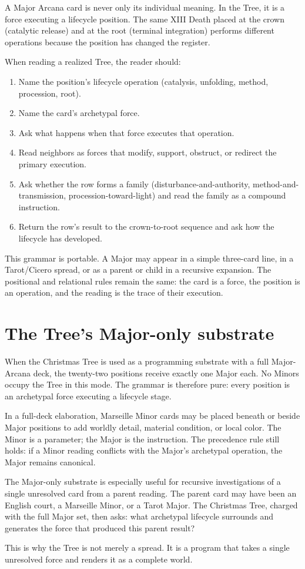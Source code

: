 A Major Arcana card is never only its individual meaning. In the Tree, it is a
force executing a lifecycle position. The same XIII Death placed at the crown
(catalytic release) and at the root (terminal integration) performs different
operations because the position has changed the register.

When reading a realized Tree, the reader should:

\begin{enumerate}
\item Name the position's lifecycle operation (catalysis, unfolding, method,
      procession, root).
\item Name the card's archetypal force.
\item Ask what happens when that force executes that operation.
\item Read neighbors as forces that modify, support, obstruct, or redirect the
      primary execution.
\item Ask whether the row forms a family (disturbance-and-authority,
      method-and-transmission, procession-toward-light) and read the family as a
      compound instruction.
\item Return the row's result to the crown-to-root sequence and ask how the
      lifecycle has developed.
\end{enumerate}

This grammar is portable. A Major may appear in a simple three-card line, in a
Tarot/Cicero spread, or as a parent or child in a recursive expansion. The
positional and relational rules remain the same: the card is a force, the
position is an operation, and the reading is the trace of their execution.

\section{The Tree's Major-only substrate}

When the Christmas Tree is used as a programming substrate with a full
Major-Arcana deck, the twenty-two positions receive exactly one Major each. No
Minors occupy the Tree in this mode. The grammar is therefore pure: every
position is an archetypal force executing a lifecycle stage.

In a full-deck elaboration, Marseille Minor cards may be placed beneath or
beside Major positions to add worldly detail, material condition, or local
color. The Minor is a parameter; the Major is the instruction. The precedence
rule still holds: if a Minor reading conflicts with the Major's archetypal
operation, the Major remains canonical.

The Major-only substrate is especially useful for recursive investigations of a
single unresolved card from a parent reading. The parent card may have been an
English court, a Marseille Minor, or a Tarot Major. The Christmas Tree, charged
with the full Major set, then asks: what archetypal lifecycle surrounds and
generates the force that produced this parent result?

This is why the Tree is not merely a spread. It is a program that takes a
single unresolved force and renders it as a complete world.
